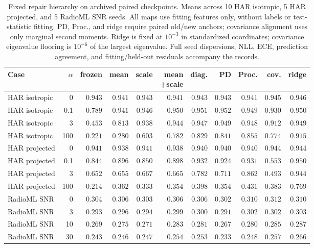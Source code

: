 \begin{table}[t]
\centering
\caption{Fixed repair hierarchy on archived paired checkpoints. Means across 10 HAR isotropic, 5 HAR projected, and 5 RadioML SNR seeds. All maps use fitting features only, without labels or test-statistic fitting. PD, Proc., and ridge require paired old/new anchors; covariance alignment uses only marginal second moments. Ridge is fixed at $10^{-3}$ in standardized coordinates; covariance eigenvalue flooring is $10^{-6}$ of the largest eigenvalue. Full seed dispersions, NLL, ECE, prediction agreement, and fitting/held-out residuals accompany the records.}
\label{tab:repair_hierarchy}
\footnotesize
\setlength{\tabcolsep}{3pt}
\begin{tabular}{lrrrrrrrrrr}
\toprule
Case & $\alpha$ & frozen & mean & scale & \shortstack{mean\\+scale} & diag. & PD & Proc. & cov. & ridge \\
\midrule
HAR isotropic & 0 & $0.943$ & $0.941$ & $0.943$ & $0.941$ & $0.943$ & $0.943$ & $0.941$ & $0.945$ & $0.946$ \\
HAR isotropic & 0.1 & $0.789$ & $0.941$ & $0.946$ & $0.950$ & $0.951$ & $0.952$ & $0.949$ & $0.930$ & $0.950$ \\
HAR isotropic & 3 & $0.453$ & $0.813$ & $0.938$ & $0.944$ & $0.947$ & $0.949$ & $0.948$ & $0.912$ & $0.949$ \\
HAR isotropic & 100 & $0.221$ & $0.280$ & $0.603$ & $0.782$ & $0.829$ & $0.841$ & $0.855$ & $0.774$ & $0.915$ \\
\midrule
HAR projected & 0 & $0.941$ & $0.938$ & $0.941$ & $0.938$ & $0.940$ & $0.940$ & $0.940$ & $0.944$ & $0.944$ \\
HAR projected & 0.1 & $0.844$ & $0.896$ & $0.850$ & $0.898$ & $0.932$ & $0.924$ & $0.931$ & $0.553$ & $0.950$ \\
HAR projected & 3 & $0.652$ & $0.655$ & $0.667$ & $0.665$ & $0.782$ & $0.711$ & $0.862$ & $0.493$ & $0.944$ \\
HAR projected & 100 & $0.214$ & $0.362$ & $0.333$ & $0.354$ & $0.398$ & $0.354$ & $0.431$ & $0.383$ & $0.769$ \\
\midrule
RadioML SNR & 0 & $0.304$ & $0.306$ & $0.303$ & $0.306$ & $0.306$ & $0.302$ & $0.310$ & $0.312$ & $0.310$ \\
RadioML SNR & 3 & $0.293$ & $0.296$ & $0.294$ & $0.299$ & $0.300$ & $0.291$ & $0.302$ & $0.302$ & $0.303$ \\
RadioML SNR & 10 & $0.269$ & $0.275$ & $0.271$ & $0.283$ & $0.281$ & $0.267$ & $0.280$ & $0.285$ & $0.287$ \\
RadioML SNR & 30 & $0.243$ & $0.246$ & $0.247$ & $0.254$ & $0.253$ & $0.233$ & $0.248$ & $0.257$ & $0.266$ \\
\bottomrule
\end{tabular}
\end{table}
